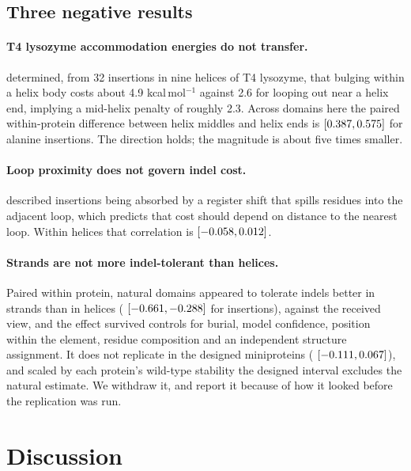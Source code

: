 \documentclass[11pt]{article}
\begin{document}
\subsection{Three negative results}

\paragraph{T4 lysozyme accommodation energies do not transfer.} \citet{vetter1996} determined,
from 32 insertions in nine helices of T4 lysozyme, that bulging within a helix body costs about
4.9 kcal\,mol$^{-1}$ against 2.6 for looping out near a helix end, implying a mid-helix penalty of
roughly 2.3. Across \NhelDom{} domains here the paired within-protein difference between helix
middles and helix ends is \HelMidEnd{} $[0.387{}, 0.575{}]$ for alanine insertions.
The direction holds; the magnitude is about five times smaller.

\paragraph{Loop proximity does not govern indel cost.} \citet{heinz1994} described insertions
being absorbed by a register shift that spills residues into the adjacent loop, which predicts
that cost should depend on distance to the nearest loop. Within helices that correlation is
\RhoLoop{} $[-0.058{}, 0.012{}]$.

\paragraph{Strands are not more indel-tolerant than helices.} Paired within protein, natural
domains appeared to tolerate indels better in strands than in helices (\StrandHelix{}
$[-0.661{}, -0.288{}]$ for insertions), against the received view, and the effect
survived controls for burial, model confidence, position within the element, residue composition
and an independent structure assignment. It does not replicate in the designed miniproteins
(\DesStrandHelix{} $[-0.111{}, 0.067{}]$), and scaled by each protein's
wild-type stability the designed interval excludes the natural estimate. We withdraw it, and
report it because of how it looked before the replication was run.

\section{Discussion}
\end{document}
